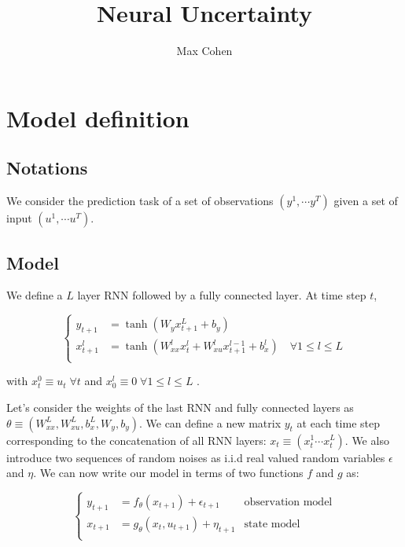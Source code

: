 \documentclass[10pt,a4paper]{report}
\begin{document}
\title{Neural Uncertainty}
\author{Max Cohen}

\chapter{Model definition}
\section{Notations}
We consider the prediction task of a set of observations $(y^1, \cdots y^T)$ given a set of input $(u^1, \cdots u^T)$.

\section{Model}
We define a $L$ layer RNN followed by a fully connected layer. At time step $t$,

\begin{equation*}
    \left\{
    \begin{aligned}
        y_{t+1}   & = \tanh(W_y x_{t+1}^L + b_y)                                                               \\
        x_{t+1}^l & = \tanh(W_{xx}^l x^{l}_{t} + W_{xu}^l x^{l-1}_{t+1} + b_x^l) \quad \forall 1 \leq l \leq L \\
    \end{aligned}
    \right.
\end{equation*}

with $x_{t}^0 \equiv u_{t} \; \forall t$ and $x_{0}^l \equiv 0 \; \forall 1 \leq l \leq L$ .

Let's consider the weights of the last RNN and fully connected layers as $\theta \equiv (W_{xx}^L, W_{xu}^L, b_x^L, W_y, b_y)$. We can define a new matrix $y_t$ at each time step corresponding to the concatenation of all RNN layers: $x_t \equiv (x_t^1 \cdots x_t^L)$. We also introduce two sequences of random noises as i.i.d real valued random variables $\epsilon$ and $\eta$. We can now write our model in terms of two functions $f$ and $g$ as:

\begin{equation}
    \left\{
    \begin{aligned}
        y_{t+1} & = f_\theta(x_{t+1}) + \epsilon_{t+1}    & \text{observation model} \\
        x_{t+1} & = g_\theta(x_{t}, u_{t+1}) + \eta_{t+1} & \text{state model}       \\
    \end{aligned}
    \right.
\end{equation}
\end{document}
